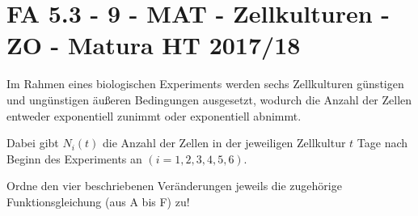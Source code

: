 \section{FA 5.3 - 9 - MAT - Zellkulturen - ZO - Matura HT 2017/18}

\begin{beispiel}[FA 5.3]{1} %
Im Rahmen eines biologischen Experiments werden sechs Zellkulturen günstigen und ungünstigen äußeren Bedingungen ausgesetzt, wodurch die Anzahl der Zellen entweder exponentiell zunimmt oder exponentiell abnimmt.

Dabei gibt $N_i(t)$ die Anzahl der Zellen in der jeweiligen Zellkultur $t$ Tage nach Beginn des Experiments an $(i=1,2,3,4,5,6)$.

Ordne den vier beschriebenen Veränderungen jeweils die zugehörige Funktionsgleichung (aus A bis F) zu!

\end{beispiel}